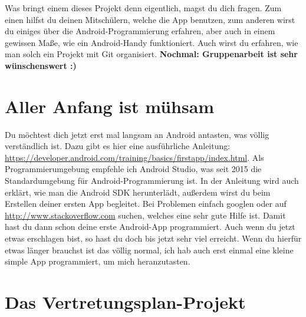 \documentclass[12pt,headsepline]{scrartcl}
\begin{document}
Was bringt einem dieses Projekt denn eigentlich, magst du dich fragen. Zum einen hilfst du deinen Mitschülern, welche die App benutzen, zum anderen wirst du einiges über die Android-Programmierung erfahren, aber auch in einem gewissen Maße, wie ein Android-Handy funktioniert. Auch wirst du erfahren, wie man solch ein Projekt mit Git organisiert.
\newline
\textbf{Nochmal: Gruppenarbeit ist sehr wünschenswert :)}
\newpage
\section{Aller Anfang ist mühsam}

Du möchtest dich jetzt erst mal langsam an Android antasten, was völlig verständlich ist. Dazu gibt es hier eine ausführliche Anleitung: \url{https://developer.android.com/training/basics/firstapp/index.html}. Als Programmierumgebung empfehle ich Android Studio, was seit 2015 die Standardumgebung für Android-Programmierung ist. In der Anleitung wird auch erklärt, wie man die Android SDK herunterlädt, außerdem wirst du beim Erstellen deiner ersten App begleitet. Bei Problemen einfach googlen oder auf \url{http://www.stackoverflow.com} suchen, welches eine sehr gute Hilfe ist.
Damit hast du dann schon deine erste Android-App programmiert. Auch wenn du jetzt etwas erschlagen bist, so hast du doch bis jetzt sehr viel erreicht. Wenn du hierfür etwas länger brauchst ist das völlig normal, ich hab auch erst einmal eine kleine simple App programmiert, um mich heranzutasten.

\section{Das Vertretungsplan-Projekt}
\end{document}
